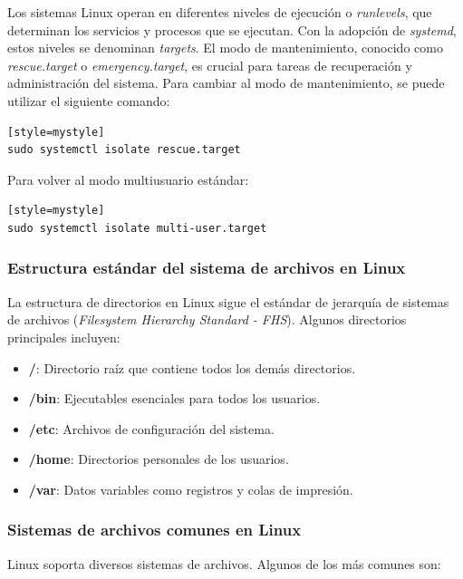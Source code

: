 Los sistemas Linux operan en diferentes niveles de ejecución o \textit{runlevels}, que determinan los servicios y procesos que se ejecutan. Con la adopción de \textit{systemd}, estos niveles se denominan \textit{targets}. El modo de mantenimiento, conocido como \textit{rescue.target} o \textit{emergency.target}, es crucial para tareas de recuperación y administración del sistema. Para cambiar al modo de mantenimiento, se puede utilizar el siguiente comando:

\begin{lstlisting}[style=mystyle][style=mystyle]
sudo systemctl isolate rescue.target
\end{lstlisting}

Para volver al modo multiusuario estándar:

\begin{lstlisting}[style=mystyle][style=mystyle]
sudo systemctl isolate multi-user.target
\end{lstlisting}

\subsubsection{Estructura estándar del sistema de archivos en Linux}

La estructura de directorios en Linux sigue el estándar de jerarquía de sistemas de archivos (\textit{Filesystem Hierarchy Standard - FHS}). Algunos directorios principales incluyen:

\begin{itemize}
  \item \textbf{/}: Directorio raíz que contiene todos los demás directorios.
  \item \textbf{/bin}: Ejecutables esenciales para todos los usuarios.
  \item \textbf{/etc}: Archivos de configuración del sistema.
  \item \textbf{/home}: Directorios personales de los usuarios.
  \item \textbf{/var}: Datos variables como registros y colas de impresión.
\end{itemize}

\subsubsection{Sistemas de archivos comunes en Linux}

Linux soporta diversos sistemas de archivos. Algunos de los más comunes son:

